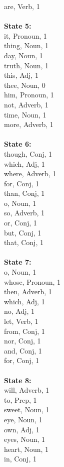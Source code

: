 \begin{multicols}{4}
are, Verb, 1\\
\\
\noindent\textbf{State 5:} \\
it, Pronoun, 1\\
thing, Noun, 1\\
day, Noun, 1\\
truth, Noun, 1\\
this, Adj, 1\\
thee, Noun, 0\\
him, Pronoun, 1\\
not, Adverb, 1\\
time, Noun, 1\\
more, Adverb, 1\\
\\
\noindent\textbf{State 6:} \\
though, Conj, 1\\
which, Adj, 1\\
where, Adverb, 1\\
for, Conj, 1\\
than, Conj, 1\\
o, Noun, 1\\
so, Adverb, 1\\
or, Conj, 1\\
but, Conj, 1\\
that, Conj, 1\\
\\
\noindent\textbf{State 7:} \\
o, Noun, 1\\
whose, Pronoun, 1\\
then, Adverb, 1\\
which, Adj, 1\\
no, Adj, 1\\
let, Verb, 1\\
from, Conj, 1\\
nor, Conj, 1\\
and, Conj, 1\\
for, Conj, 1\\
\\
\noindent\textbf{State 8:} \\
will, Adverb, 1\\
to, Prep, 1\\
sweet, Noun, 1\\
eye, Noun, 1\\
own, Adj, 1\\
eyes, Noun, 1\\
heart, Noun, 1\\
in, Conj, 1\\

\end{multicols}
